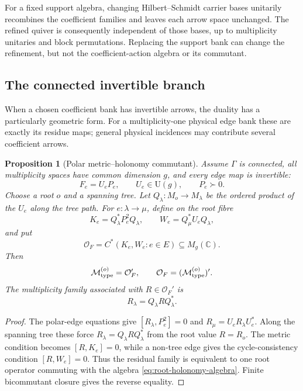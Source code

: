 \documentclass[11pt]{article}
\numberwithin{equation}{section}
\newtheorem{proposition}[theorem]{Proposition}
\theoremstyle{definition}
\theoremstyle{remark}
\newcommand{\C}{\mathbb C}
\newcommand{\U}{\mathrm U}
\newcommand{\M}{\mathcal M}
\newcommand{\Oalg}{\mathcal O}
\begin{document}
For a fixed support algebra, changing Hilbert--Schmidt carrier bases
unitarily recombines the coefficient families and leaves each arrow space
unchanged.  The refined quiver is consequently independent of those bases,
up to multiplicity unitaries and block permutations.  Replacing the support
bank can change the refinement, but not the coefficient-action algebra or
its commutant.


\subsection{The connected invertible branch}

When a chosen coefficient bank has invertible arrows, the duality has a
particularly geometric form.  For a multiplicity-one physical edge bank these
are exactly its residue maps; general physical incidences may contribute
several coefficient arrows.

\begin{proposition}[Polar metric--holonomy commutant]
\label{thm:polar-holonomy}
Assume $\Gamma$ is connected, all multiplicity spaces have common dimension
$g$, and every edge map is invertible:
\[
F_e=U_eP_e,
\qquad
U_e\in\U(g),
\qquad
P_e\succ0.
\]
Choose a root $o$ and a spanning tree.  Let
$Q_\lambda:M_o\to M_\lambda$ be the ordered product of the $U_e$ along the
tree path.  For $e:\lambda\to\mu$, define on the root fibre
\[
K_e=Q_\lambda^*P_e^2Q_\lambda,
\qquad
W_e=Q_\mu^*U_eQ_\lambda,
\]
and put
\begin{equation}
\Oalg_F
=
C^*(K_e,W_e:e\in E)\subseteq M_g(\C).
\label{eq:root-holonomy-algebra}
\end{equation}
Then
\begin{equation}
\M_{\rm type}^{(o)}
=
\Oalg_F',
\qquad
\Oalg_F
=
(\M_{\rm type}^{(o)})'.
\label{eq:root-holonomy-duality}
\end{equation}
The multiplicity family associated with
$R\in\Oalg_F'$ is
\[
R_\lambda=Q_\lambda RQ_\lambda^*.
\]
\end{proposition}

\begin{proof}
The polar-edge equations give
$[R_\lambda,P_e^2]=0$ and
$R_\mu=U_eR_\lambda U_e^*$.
Along the spanning tree these force
$R_\lambda=Q_\lambda RQ_\lambda^*$ from the root value $R=R_o$.
The metric condition becomes $[R,K_e]=0$, while a non-tree edge gives the
cycle-consistency condition $[R,W_e]=0$.  Thus the residual family is
equivalent to one root operator commuting with the algebra
\eqref{eq:root-holonomy-algebra}.  Finite bicommutant closure gives the reverse
equality.
\end{proof}
\end{document}
